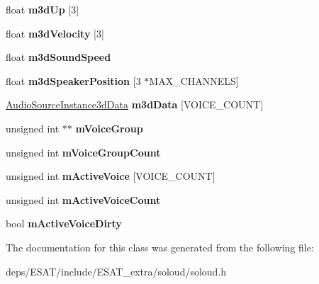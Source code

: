 \begin{DoxyCompactItemize}
float {\bfseries m3d\+Up} \mbox{[}3\mbox{]}
\item 
\mbox{\label{class_so_loud_1_1_soloud_a7c9508ed8f417a50139437dff91a97d0}} 
float {\bfseries m3d\+Velocity} \mbox{[}3\mbox{]}
\item 
\mbox{\label{class_so_loud_1_1_soloud_a839ec9792fea1726d9a5f8bd051e2dc8}} 
float {\bfseries m3d\+Sound\+Speed}
\item 
\mbox{\label{class_so_loud_1_1_soloud_afc429f49243a6e8630e8e77fb91de2b5}} 
float {\bfseries m3d\+Speaker\+Position} \mbox{[}3 $\ast$M\+A\+X\+\_\+\+C\+H\+A\+N\+N\+E\+LS\mbox{]}
\item 
\mbox{\label{class_so_loud_1_1_soloud_acfcc5483722182cbb1ed2725dfad96ab}} 
\mbox{\hyperlink{class_so_loud_1_1_audio_source_instance3d_data}{Audio\+Source\+Instance3d\+Data}} {\bfseries m3d\+Data} \mbox{[}V\+O\+I\+C\+E\+\_\+\+C\+O\+U\+NT\mbox{]}
\item 
\mbox{\label{class_so_loud_1_1_soloud_a2c1dd6c4112237ba72aa4327dc8f93d9}} 
unsigned int $\ast$$\ast$ {\bfseries m\+Voice\+Group}
\item 
\mbox{\label{class_so_loud_1_1_soloud_aa357dabf12da3da5a41dad5ad173c591}} 
unsigned int {\bfseries m\+Voice\+Group\+Count}
\item 
\mbox{\label{class_so_loud_1_1_soloud_a10b21e8eba963e5eb7ee0906bca13e2f}} 
unsigned int {\bfseries m\+Active\+Voice} \mbox{[}V\+O\+I\+C\+E\+\_\+\+C\+O\+U\+NT\mbox{]}
\item 
\mbox{\label{class_so_loud_1_1_soloud_a1ff63234f1884fcf79c3822f472a3354}} 
unsigned int {\bfseries m\+Active\+Voice\+Count}
\item 
\mbox{\label{class_so_loud_1_1_soloud_a32b6db392c5f3f268399a7441176e5c0}} 
bool {\bfseries m\+Active\+Voice\+Dirty}
\end{DoxyCompactItemize}


The documentation for this class was generated from the following file\+:\begin{DoxyCompactItemize}
\item 
deps/\+E\+S\+A\+T/include/\+E\+S\+A\+T\+\_\+extra/soloud/soloud.\+h\end{DoxyCompactItemize}
